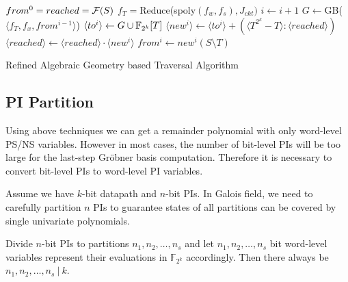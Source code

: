 \begin{algorithm}[hbt]
\SetAlgoNoLine

  $from^0 = reached = {\mathcal{F}}(S)$\;
  $f_T = $Reduce(spoly$(f_w,f_s), J_{ckt})$\;
  {
  	$i \gets i + 1$\;
  	$G \gets$GB($\langle f_T ,f_x, from^{i-1}\rangle$)\;
	$\langle to^i \rangle \gets G\cup {\mathbb{F}}_{2^k}[T]$\;
	$\langle new^i\rangle \gets \langle to^i\rangle + (\langle T^{2^k}-T\rangle:\langle reached\rangle)$\;
  	$\langle reached\rangle \gets \langle reached\rangle \cdot \langle new^i\rangle$\;
	$from^i \gets new^i(S\setminus T)$\;
  }
\caption {Refined Algebraic Geometry based Traversal Algorithm}\label{alg:refined}
\end{algorithm}

\subsection{PI Partition}
Using above techniques we can get a remainder polynomial with only word-level PS/NS variables. However in most 
cases, the number of bit-level PIs will be too large for the last-step Gr\"obner basis computation. Therefore it is necessary
to convert bit-level PIs to word-level PI variables. 

Assume we have $k$-bit datapath and $n$-bit PIs. In Galois field, we need to carefully partition $n$ PIs
to guarantee states of all partitions can be covered by single univariate polynomials.

\begin{Proposition}
Divide $n$-bit PIs to partitions $n_1,n_2,\dots, n_s$ and let $n_1,n_2,\dots,n_s$ bit word-level variables
represent their evaluations in $\mathbb F_{2^k}$ accordingly. Then there always be $n_1,n_2,\dots,n_s~|~k$.
\end{Proposition}

